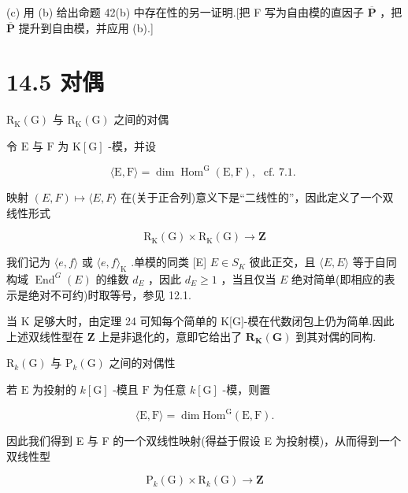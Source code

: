 \documentclass[10pt]{article}
\begin{document}
(c) 用 (b) 给出命题 42(b) 中存在性的另一证明.[把 F 写为自由模的直因子 \(\overline{\mathbf{P}}\) ，把 \(\overline{\mathbf{P}}\) 提升到自由模，并应用 (b).]

\section*{14.5 对偶}

\({\mathrm{R}}_{\mathrm{K}}\left( \mathrm{G}\right)\) 与 \({\mathrm{R}}_{\mathrm{K}}\left( \mathrm{G}\right)\) 之间的对偶

令 \(\mathrm{E}\) 与 \(\mathrm{F}\) 为 \(\mathrm{K}\left\lbrack  \mathrm{G}\right\rbrack\) -模，并设

\[
\langle \mathrm{E},\mathrm{F}\rangle  = \dim {\operatorname{Hom}}^{\mathrm{G}}\left( {\mathrm{E},\mathrm{F}}\right) ,\;\text{ cf. 7.1. }
\]

映射 \(\left( {E,F}\right)  \mapsto  \langle E,F\rangle\) 在(关于正合列)意义下是“二线性的”，因此定义了一个双线性形式

\[
{\mathrm{R}}_{\mathrm{K}}\left( \mathrm{G}\right)  \times  {\mathrm{R}}_{\mathrm{K}}\left( \mathrm{G}\right)  \rightarrow  \mathbf{Z}
\]

我们记为 \(\langle e,f\rangle\) 或 \(\langle e,f{\rangle }_{\mathrm{K}}\) .单模的同类 [E] \(E \in  {S}_{K}\) 彼此正交，且 \(\langle E,E\rangle\) 等于自同构域 \({\operatorname{End}}^{G}\left( E\right)\) 的维数 \({d}_{E}\) ，因此 \({d}_{E} \geq  1\) ，当且仅当 \(E\) 绝对简单(即相应的表示是绝对不可约)时取等号，参见 12.1.

当 K 足够大时，由定理 24 可知每个简单的 K[G]-模在代数闭包上仍为简单.因此上述双线性型在 \(\mathbf{Z}\) 上是非退化的，意即它给出了 \({\mathbf{R}}_{\mathbf{K}}\left( \mathbf{G}\right)\) 到其对偶的同构.

\({\mathrm{R}}_{k}\left( \mathrm{G}\right)\) 与 \({\mathrm{P}}_{k}\left( \mathrm{G}\right)\) 之间的对偶性

若 \(\mathrm{E}\) 为投射的 \(k\left\lbrack  \mathrm{G}\right\rbrack\) -模且 \(\mathrm{F}\) 为任意 \(k\left\lbrack  \mathrm{G}\right\rbrack\) -模，则置

\[
\langle \mathrm{E},\mathrm{F}\rangle  = \dim {\mathrm{{Hom}}}^{\mathrm{G}}\left( {\mathrm{E},\mathrm{F}}\right) .
\]

因此我们得到 E 与 F 的一个双线性映射(得益于假设 E 为投射模)，从而得到一个双线性型

\[
{\mathrm{P}}_{k}\left( \mathrm{G}\right)  \times  {\mathrm{R}}_{k}\left( \mathrm{G}\right)  \rightarrow  \mathbf{Z}
\]
\end{document}
